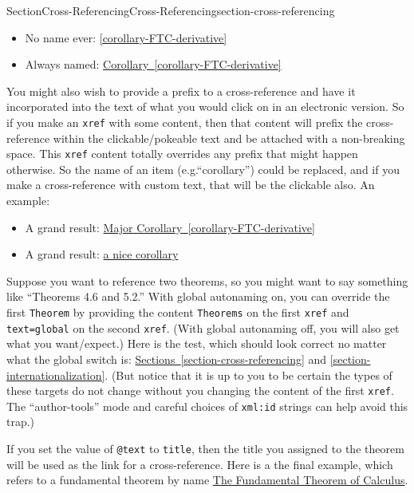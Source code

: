 \documentclass[twoside,10pt,]{article}
\newcommand{\xreffont}{\relax}
\newcommand{\mono}[1]{\texttt{#1}}
\numberwithin{equation}{section}
\begin{document}
\begin{sectionptx}{Section}{Cross-Referencing}{}{Cross-Referencing}{}{}{section-cross-referencing}
\begin{itemize}[label=\textbullet]
\item{}No name ever: \hyperref[corollary-FTC-derivative]{{\xreffont\ref{corollary-FTC-derivative}}}%
\item{}Always named: \hyperref[corollary-FTC-derivative]{Corollary~{\xreffont\ref{corollary-FTC-derivative}}}%
\end{itemize}
%
\par
You might also wish to provide a prefix to a cross-reference and have it incorporated into the text of what you would click on in an electronic version.  So if you make an \mono{xref} with some content, then that content will prefix the cross-reference within the clickable\slash{}pokeable text and be attached with a non-breaking space.  This \mono{xref} content totally overrides any prefix that might happen otherwise.  So the name of an item (e.g.\@ ``corollary'') could be replaced, and if you make a cross-reference with custom text, that will be the clickable also.  An example:%
\begin{itemize}[label=\textbullet]
\item{}A grand result: \hyperref[corollary-FTC-derivative]{Major Corollary~{\xreffont\ref{corollary-FTC-derivative}}}%
\item{}A grand result: \hyperref[corollary-FTC-derivative]{a nice corollary}%
\end{itemize}
%
\par
Suppose you want to reference two theorems, so you might want to say something like ``Theorems 4.6 and 5.2.''  With global autonaming on, you can override the first \mono{Theorem} by providing the content \mono{Theorems} on the first \mono{xref} and \mono{text=\textquotedbl{}global\textquotedbl{}} on the second \mono{xref}.  (With global autonaming off, you will also get what you want\slash{}expect.)   Here is the test, which should look correct no matter what the global switch is:  \hyperref[section-cross-referencing]{Sections~{\xreffont\ref{section-cross-referencing}}} and \hyperref[section-internationalization]{{\xreffont\ref{section-internationalization}}}.  (But notice that it is up to you to be certain the types of these targets do not change without you changing the content of the first \mono{xref}.  The ``author-tools'' mode and careful choices of \mono{xml:id} strings can help avoid this trap.)%
\par
If you set the value of \mono{@text} to \mono{title}, then the title you assigned to the theorem will be used as the link for a cross-reference.  Here is a the final example, which refers to a fundamental theorem by name \hyperref[theorem-FTC]{The Fundamental Theorem of Calculus}.%

\end{sectionptx}
\end{document}
